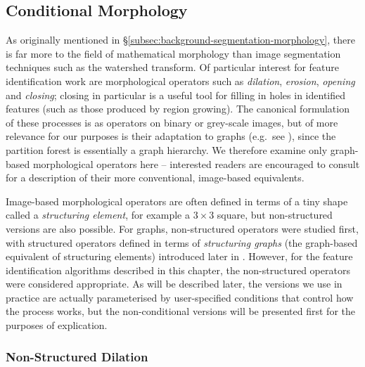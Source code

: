 
\subsection{Conditional Morphology}


As originally mentioned in \S\ref{subsec:background-segmentation-morphology}, there is far more to the field of mathematical morphology than image segmentation techniques such as the watershed transform. Of particular interest for feature identification work are morphological operators such as \emph{dilation}, \emph{erosion}, \emph{opening} and \emph{closing}; closing in particular is a useful tool for filling in holes in identified features (such as those produced by region growing). The canonical formulation of these processes is as operators on binary or grey-scale images, but of more relevance for our purposes is their adaptation to graphs (e.g.~see \cite{heijmans92a}), since the partition forest is essentially a graph hierarchy. We therefore examine only graph-based morphological operators here -- interested readers are encouraged to consult \cite{gonzalez02} for a description of their more conventional, image-based equivalents.

Image-based morphological operators are often defined in terms of a tiny shape called a \emph{structuring element}, for example a $3 \times 3$ square, but non-structured versions are also possible. For graphs, non-structured operators were studied first, with structured operators defined in terms of \emph{structuring graphs} (the graph-based equivalent of structuring elements) introduced later in \cite{heijmans92a}. However, for the feature identification algorithms described in this chapter, the non-structured operators were considered appropriate. As will be described later, the versions we use in practice are actually parameterised by user-specified conditions that control how the process works, but the non-conditional versions will be presented first for the purposes of explication.

\subsubsection{Non-Structured Dilation}

